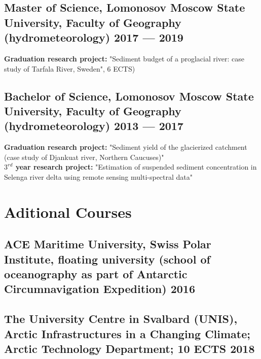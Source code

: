 \documentclass[a4,10pt]{article}
\begin{document}
\subsection*{Master of Science, {\normalsize \normalfont Lomonosov Moscow State University, Faculty of Geography (hydrometeorology)} \hfill 2017 --- 2019} 
\textbf{Graduation research project:} "Sediment budget of a proglacial river: case study of Tarfala River, Sweden", 6 ECTS)
\vspace{0.1cm}

\subsection*{Bachelor of Science, {\normalsize \normalfont Lomonosov Moscow State University, Faculty of Geography (hydrometeorology)} \hfill 2013 --- 2017} 
\textbf{Graduation research project:} "Sediment yield of the glacierized catchment (case study of Djankuat river, Northern Caucuses)"\\
\textbf{$3^{rd}$ year research project:} "Estimation of suspended sediment concentration in Selenga river delta using remote sensing multi-spectral data" 
\vspace{0.2cm}

\section{Aditional Courses }
\subsection*{ACE Maritime University, {\normalsize \normalfont Swiss Polar Institute, floating university (school of oceanography as part of Antarctic Circumnavigation Expedition)} \hfill 2016} 
\vspace{0.1cm}
\subsection*{The University Centre in Svalbard (UNIS), {\normalsize \normalfont Arctic Infrastructures in a Changing Climate; Arctic Technology Department; 10 ECTS} \hfill 2018} 
\vspace{0.2cm}
\end{document}
